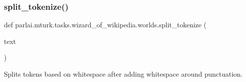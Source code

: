 \subsubsection{\texorpdfstring{split\+\_\+tokenize()}{split\_tokenize()}}
{\footnotesize\ttfamily def parlai.\+mturk.\+tasks.\+wizard\+\_\+of\+\_\+wikipedia.\+worlds.\+split\+\_\+tokenize (\begin{DoxyParamCaption}\item[{}]{text }\end{DoxyParamCaption})}

\begin{DoxyVerb}Splits tokens based on whitespace after adding whitespace around punctuation.
\end{DoxyVerb}
 